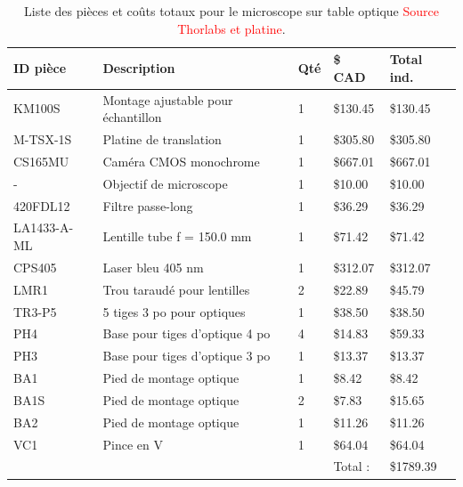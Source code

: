 \documentclass[11pt,letterpaper]{article}
\begin{document}
\begin{table}[!ht]
    \centering
    \caption{Liste des pièces et coûts totaux pour le microscope sur table optique
    \textcolor{red}{Source Thorlabs et platine}.}
    \begin{tabular}{|l|l|l|l|l|}
    \hline
        ID pièce & Description & Qté & \$ CAD & Total ind. \\ \hline\hline
        KM100S & Montage ajustable pour échantillon & 1 & \$130.45 & \$130.45 \\ \hline
        M-TSX-1S & Platine de translation & 1 & \$305.80 & \$305.80 \\ \hline
        CS165MU & Caméra CMOS monochrome & 1 & \$667.01 & \$667.01 \\ \hline
        - & Objectif de microscope & 1 & \$10.00 & \$10.00 \\ \hline
        420FDL12 & Filtre passe-long & 1 & \$36.29 & \$36.29 \\ \hline
        LA1433-A-ML & Lentille tube f = 150.0 mm & 1 & \$71.42 & \$71.42 \\ \hline
        CPS405 & Laser bleu 405 nm & 1 & \$312.07 & \$312.07 \\ \hline
        LMR1 & Trou taraudé pour lentilles & 2 & \$22.89 & \$45.79 \\ \hline
        TR3-P5 & 5 tiges 3 po pour optiques & 1 & \$38.50 & \$38.50 \\ \hline
        PH4 & Base pour tiges d'optique 4 po & 4 & \$14.83 & \$59.33 \\ \hline
        PH3 & Base pour tiges d'optique 3 po & 1 & \$13.37 & \$13.37 \\ \hline
        BA1 & Pied de montage optique & 1 & \$8.42 & \$8.42 \\ \hline
        BA1S & Pied de montage optique & 2 & \$7.83 & \$15.65 \\ \hline
        BA2 & Pied de montage optique & 1 & \$11.26 & \$11.26 \\ \hline
        VC1 & Pince en V & 1 & \$64.04 & \$64.04 \\ \hline\hline
        ~ & ~ & ~ & Total : & \$1789.39 \\ \hline
    \end{tabular}
    \label{table_cout}
\end{table}

\end{document}
